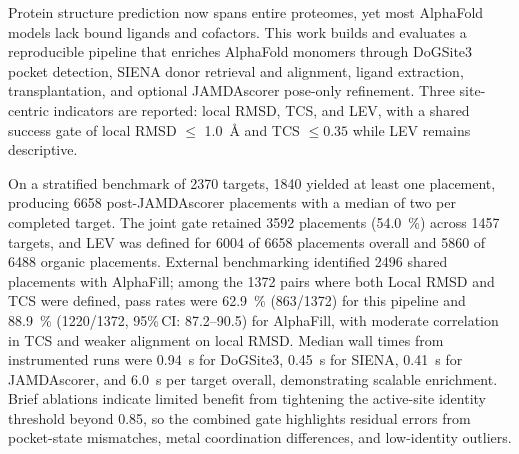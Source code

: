 \small
Protein structure prediction now spans entire proteomes, yet most AlphaFold models lack bound ligands and cofactors. This work builds and evaluates a reproducible pipeline that enriches AlphaFold monomers through DoGSite3 pocket detection, SIENA donor retrieval and alignment, ligand extraction, transplantation, and optional JAMDAscorer pose-only refinement. Three site-centric indicators are reported: local RMSD, TCS, and LEV, with a shared success gate of local RMSD $\leq$ \SI{1.0}{\angstrom} and TCS $\leq 0.35$ while LEV remains descriptive.

On a stratified benchmark of \num{2370} targets, \num{1840} yielded at least one placement, producing \num{6658} post-JAMDAscorer placements with a median of two per completed target. The joint gate retained \num{3592} placements (\SI{54.0}{\percent}) across \num{1457} targets, and LEV was defined for \num{6004} of \num{6658} placements overall and \num{5860} of \num{6488} organic placements. External benchmarking identified \num{2496} shared placements with AlphaFill; among the \num{1372} pairs where both Local RMSD and TCS were defined, pass rates were \SI{62.9}{\percent} (\num{863}/\num{1372}) for this pipeline and \SI{88.9}{\percent} (\num{1220}/\num{1372}, 95\%\,CI: 87.2--90.5) for AlphaFill, with moderate correlation in TCS and weaker alignment on local RMSD. Median wall times from instrumented runs were \SI{0.94}{\second} for DoGSite3, \SI{0.45}{\second} for SIENA, \SI{0.41}{\second} for JAMDAscorer, and \SI{6.0}{\second} per target overall, demonstrating scalable enrichment. Brief ablations indicate limited benefit from tightening the active-site identity threshold beyond 0.85, so the combined gate highlights residual errors from pocket-state mismatches, metal coordination differences, and low-identity outliers.

\normalsize
